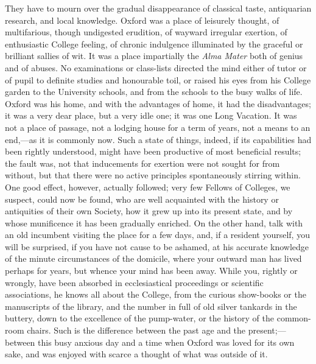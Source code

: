 They have to mourn over the
gradual disappearance of classical taste, antiquarian research, and
local knowledge. Oxford was a place of leisurely thought, of
multifarious, though undigested erudition, of wayward irregular
exertion, of enthusiastic College feeling, of chronic indulgence
illuminated by the graceful or brilliant sallies of wit. It was a
place impartially the \emph{Alma Mater} both of genius and of abuses.
No examinations or class-lists directed the mind either of tutor or of
pupil to definite studies and honourable toil, or raised his eyes from
his College garden to the University schools, and from the schools to
the busy walks of life. Oxford was his home, and with the advantages
of home, it had the disadvantages; it was a very dear place, but a
very idle one; it was one Long Vacation. It was not a place of
passage, not a lodging house for a term of years, not a means to an
end,—as it is commonly now. Such a state of things, indeed, if its
capabilities had been rightly understood, might have been productive
of most beneficial results; the fault was, not that inducements for
exertion were not sought for from without, but that there were no
active principles spontaneously stirring within. One good effect,
however, actually followed; very few Fellows of Colleges, we suspect,
could now be found, who are well acquainted with the history or
antiquities of their own Society, how it grew up into its present
state, and by whose munificence it has been gradually enriched. On the
other hand, talk with an old incumbent visiting the place for a few
days, and, if a resident yourself, you will be surprised, if you have
not cause to be ashamed, at his accurate knowledge of the minute
circumstances of the domicile, where your outward man has lived
perhaps for years, but whence your mind has been away. While you,
rightly or wrongly, have been absorbed in ecclesiastical proceedings
or scientific associations, he knows all about the College, from the
curious show-books or the manuscripts of the library, and the number
in full of old silver tankards in the buttery, down to the excellence
of the pump-water, or the history of the common-room chairs. Such is
the difference between the past age and the present;—between this
busy anxious day and a time when Oxford was loved for its own sake,
and was enjoyed with scarce a thought of what was outside of it.

